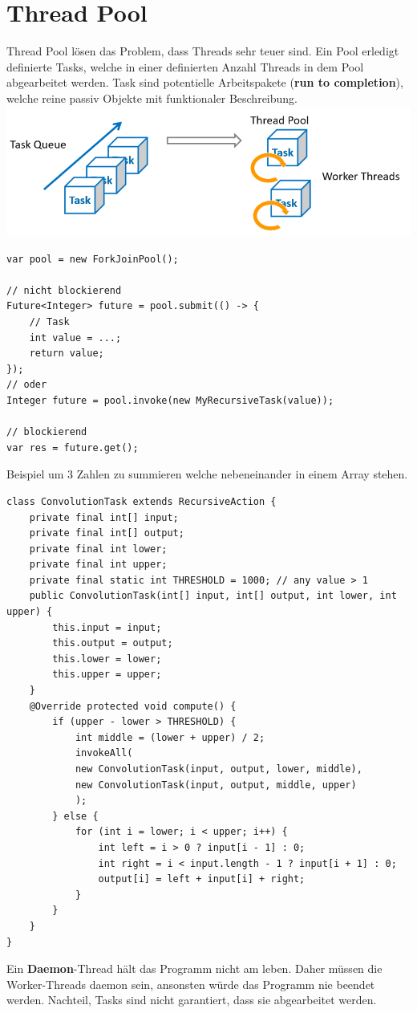 \section{Thread Pool}
Thread Pool lösen das Problem, dass Threads sehr teuer sind. Ein Pool erledigt definierte Tasks, welche in einer definierten Anzahl Threads in dem Pool abgearbeitet werden.
Task sind potentielle Arbeitspakete (\textbf{run to completion}), welche reine passiv Objekte mit funktionaler Beschreibung.\\
\includegraphics[width=\columnwidth]{Images/thread-pool}

\begin{lstlisting}
var pool = new ForkJoinPool();

// nicht blockierend
Future<Integer> future = pool.submit(() -> {
	// Task
	int value = ...;
	return value;
});
// oder
Integer future = pool.invoke(new MyRecursiveTask(value));

// blockierend
var res = future.get();
\end{lstlisting}
Beispiel um 3 Zahlen zu summieren welche nebeneinander in einem Array stehen.
\begin{lstlisting}
class ConvolutionTask extends RecursiveAction {
	private final int[] input;
	private final int[] output;
	private final int lower;
	private final int upper;
	private final static int THRESHOLD = 1000; // any value > 1
	public ConvolutionTask(int[] input, int[] output, int lower, int upper) {
		this.input = input;
		this.output = output;
		this.lower = lower;
		this.upper = upper;
	}
	@Override protected void compute() {
		if (upper - lower > THRESHOLD) {
			int middle = (lower + upper) / 2;
			invokeAll(
			new ConvolutionTask(input, output, lower, middle),
			new ConvolutionTask(input, output, middle, upper)
			);
		} else {
			for (int i = lower; i < upper; i++) {
				int left = i > 0 ? input[i - 1] : 0;
				int right = i < input.length - 1 ? input[i + 1] : 0;
				output[i] = left + input[i] + right;
			}
		}
	}
}
\end{lstlisting}

Ein \textbf{Daemon}-Thread hält das Programm nicht am leben. Daher müssen die Worker-Threads daemon sein, ansonsten würde das Programm nie beendet werden. Nachteil, Tasks sind nicht garantiert, dass sie abgearbeitet werden.


